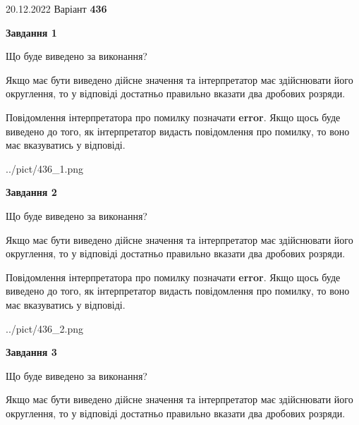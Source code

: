 \documentclass[12pt, ukrainian]{article}
\begin{document}
{20.12.2022 Варіант \No \textbf { 436 }\par}
{
\begin {Large}

{\begin {center}\textbf{Завдання 1}\end {center}}\par
Що буде виведено за виконання? \par

Якщо має бути виведено дійсне значення та інтерпретатор має здійснювати його округлення, 
то у відповіді достатньо правильно вказати два дробових розряди.

Повідомлення інтерпретатора про помилку позначати \textbf{error}.
Якщо щось буде виведено до того, як інтерпретатор видасть повідомлення про помилку, 
то воно має вказуватись у відповіді. \par

\begin{center}
	{../pict/436_1.png}
\end{center}
\newpage

{\begin {center}\textbf{Завдання 2}\end {center}}\par
Що буде виведено за виконання? \par

Якщо має бути виведено дійсне значення та інтерпретатор має здійснювати його округлення, 
то у відповіді достатньо правильно вказати два дробових розряди.

Повідомлення інтерпретатора про помилку позначати \textbf{error}.
Якщо щось буде виведено до того, як інтерпретатор видасть повідомлення про помилку, 
то воно має вказуватись у відповіді. \par

\begin{center}
	{../pict/436_2.png}
\end{center}
\newpage

{\begin {center}\textbf{Завдання 3}\end {center}}\par
Що буде виведено за виконання? \par

Якщо має бути виведено дійсне значення та інтерпретатор має здійснювати його округлення, 
то у відповіді достатньо правильно вказати два дробових розряди.


\end{Large}}
\end{document}
